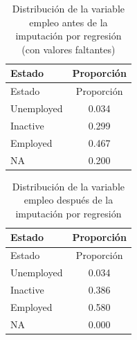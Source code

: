 \documentclass[
  spanish,
  12pt,
]{book}
\newenvironment{Shaded}{\begin{snugshade}}{\end{snugshade}}
\newcommand{\AttributeTok}[1]{\textcolor[rgb]{0.13,0.29,0.53}{#1}}
\newcommand{\FunctionTok}[1]{\textcolor[rgb]{0.13,0.29,0.53}{\textbf{#1}}}
\newcommand{\NormalTok}[1]{#1}
\newcommand{\SpecialCharTok}[1]{\textcolor[rgb]{0.81,0.36,0.00}{\textbf{#1}}}
\newcommand{\StringTok}[1]{\textcolor[rgb]{0.31,0.60,0.02}{#1}}
\begin{document}
\begin{Shaded}
\end{Shaded}

\begin{longtable}[]{@{}lc@{}}
\caption{\label{tab:tab-regresion-empleo-antes}Distribución de la variable empleo antes de la imputación por regresión (con valores faltantes)}\tabularnewline
\toprule\noalign{}
Estado & Proporción \\
\midrule\noalign{}
\endfirsthead
\toprule\noalign{}
Estado & Proporción \\
\midrule\noalign{}
\endhead
\bottomrule\noalign{}
\endlastfoot
Unemployed & 0.034 \\
Inactive & 0.299 \\
Employed & 0.467 \\
NA & 0.200 \\
\end{longtable}

\begin{Shaded}
\end{Shaded}

\begin{longtable}[]{@{}lc@{}}
\caption{\label{tab:tab-regresion-empleo-despues}Distribución de la variable empleo después de la imputación por regresión}\tabularnewline
\toprule\noalign{}
Estado & Proporción \\
\midrule\noalign{}
\endfirsthead
\toprule\noalign{}
Estado & Proporción \\
\midrule\noalign{}
\endhead
\bottomrule\noalign{}
\endlastfoot
Unemployed & 0.034 \\
Inactive & 0.386 \\
Employed & 0.580 \\
NA & 0.000 \\
\end{longtable}
\end{document}
